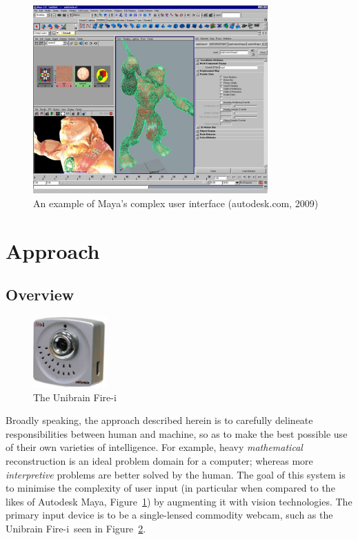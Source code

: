 \documentclass[a4paper,10pt]{article}
\begin{document}
\begin{figure}
  \begin{center}
    \includegraphics[width=340px]{maya}
  \end{center}
  \caption{An example of Maya's complex user interface (autodesk.com, 2009)}
  \label{maya}
\end{figure}

\clearpage

\section{Approach}
\subsection{Overview}

\begin{figure}
  \vspace{-20pt}
  \begin{center}
    \includegraphics[width=80pt]{firei}
  \end{center}
  \caption{The Unibrain Fire-i\texttrademark}
  \label{firei}
\end{figure}

Broadly speaking, the approach described herein is to carefully delineate responsibilities between human and machine, so as to make the best possible use of their own varieties of intelligence. For example, heavy \textit{mathematical} reconstruction is an ideal problem domain for a computer; whereas more \textit{interpretive} problems are better solved by the human. The goal of this system is to minimise the complexity of user input (in particular when compared to the likes of Autodesk Maya, Figure~\ref{maya}) by augmenting it with vision technologies. The primary input device is to be a single-lensed commodity webcam, such as the Unibrain Fire-i\texttrademark ~seen in Figure~\ref{firei}.
\end{document}
